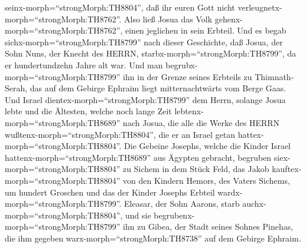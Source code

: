 seinx-morph=``strongMorph:TH8804'', daß ihr euren Gott nicht
verleugnetx-morph=``strongMorph:TH8762''.  Also ließ Josua
das Volk gehenx-morph=``strongMorph:TH8762'', einen jeglichen in sein
Erbteil.  Und es begab sichx-morph=``strongMorph:TH8799''
nach dieser Geschichte, daß Josua, der Sohn Nuns, der Knecht des HERRN,
starbx-morph=``strongMorph:TH8799'', da er hundertundzehn Jahre alt war.
 Und man begrubx-morph=``strongMorph:TH8799'' ihn in der
Grenze seines Erbteils zu Thimnath-Serah, das auf dem Gebirge Ephraim
liegt mitternachtwärts vom Berge Gaas.  Und Israel
dientex-morph=``strongMorph:TH8799'' dem Herrn, solange Josua lebte und
die Ältesten, welche noch lange Zeit
lebtenx-morph=``strongMorph:TH8689'' nach Josua, die alle die Werke des
HERRN wußtenx-morph=``strongMorph:TH8804'', die er an Israel getan
hattex-morph=``strongMorph:TH8804''.  Die Gebeine Josephs,
welche die Kinder Israel hattenx-morph=``strongMorph:TH8689'' aus
Ägypten gebracht, begruben siex-morph=``strongMorph:TH8804'' zu Sichem
in dem Stück Feld, das Jakob kauftex-morph=``strongMorph:TH8804'' von
den Kindern Hemors, des Vaters Sichems, um hundert Groschen und das der
Kinder Josephs Erbteil wardx-morph=``strongMorph:TH8799''. 
Eleasar, der Sohn Aarons, starb auchx-morph=``strongMorph:TH8804'', und
sie begrubenx-morph=``strongMorph:TH8799'' ihn zu Gibea, der Stadt
seines Sohnes Pinehas, die ihm gegeben warx-morph=``strongMorph:TH8738''
auf dem Gebirge Ephraim.
